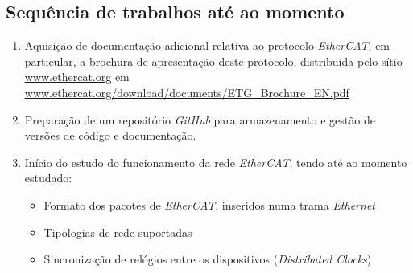 \subsection{Sequência de trabalhos até ao momento}\label{sec:seq_trabalhos}
\begin{enumerate}
    \item Aquisição de documentação adicional relativa ao protocolo \textit{EtherCAT}, em particular, a brochura
    de apresentação deste protocolo, distribuída pelo sítio \url{www.ethercat.org} em \url{www.ethercat.org/download/documents/ETG_Brochure_EN.pdf}
    \item Preparação de um repositório \textit{GitHub} para armazenamento e gestão de versões de código e documentação.
    \item Início do estudo do funcionamento da rede \textit{EtherCAT}, tendo até ao momento estudado:
        \begin{itemize}
            \item Formato dos pacotes de \textit{\textit{EtherCAT}}, inseridos numa trama \textit{Ethernet}
            \item Tipologias de rede suportadas
            \item Sincronização de relógios entre os dispositivos (\textit{Distributed Clocks})
        \end{itemize}
\end{enumerate}
